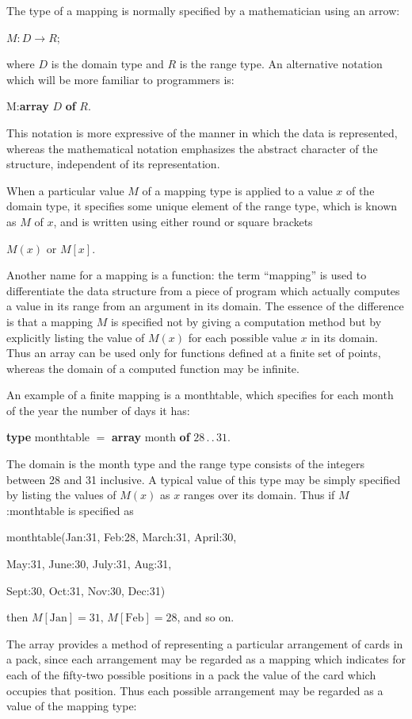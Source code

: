 The type of a mapping is normally specified by a mathematician using an arrow:

\quad $M:D\rightarrow R$;

\noindent
where $D$ is the domain type and $R$ is the range type. An alternative notation which will be more familiar to programmers is:

\quad M:\textbf{array} $D$ \textbf{of} $R$.

This notation is more expressive of the manner in which the data is represented, whereas the mathematical notation emphasizes the abstract character of the structure, independent of its representation.

When a particular value $M$ of a mapping type is applied to a value $x$ of the domain type, it specifies some unique element of the range type, which is known as $M$ of $x$, and is written using either round or square brackets

\quad $M(x)$ or $M[x]$.

\noindent
Another name for a mapping is a function: the term ``mapping'' is used to differentiate the data structure from a piece of program which actually computes a value in its range from an argument in its domain. The essence of the difference is that a mapping $M$ is specified not by giving a computation method but by explicitly listing the value of $M(x)$ for each possible value $x$ in its domain. Thus an array can be used only for functions defined at a finite set of points, whereas the domain of a computed function may be infinite.

An example of a finite mapping is a monthtable, which specifies for each month of the year the number of days it has:

\quad \textbf{type} monthtable $=$ \textbf{array} month \textbf{of} $28\,.\,.\,31$.

\noindent
The domain is the month type and the range type consists of the integers between 28 and 31 inclusive. A typical value of this type may be simply specified by listing the values of $M(x)$ as $x$ ranges over its domain. Thus if $M$:monthtable is specified as

\quad monthtable(Jan:31, Feb:28, March:31, April:30,

\quad May:31, June:30, July:31, Aug:31,

\quad Sept:30, Oct:31, Nov:30, Dec:31)

\noindent
then $M[\text{Jan}] = 31,\, M[\text{Feb}] = 28$, and so on.

The array provides a method of representing a particular arrangement of cards in a pack, since each arrangement may be regarded as a mapping which indicates for each of the fifty-two possible positions in a pack the value of the card which occupies that position. Thus each possible arrangement may be regarded as a value of the mapping type:

